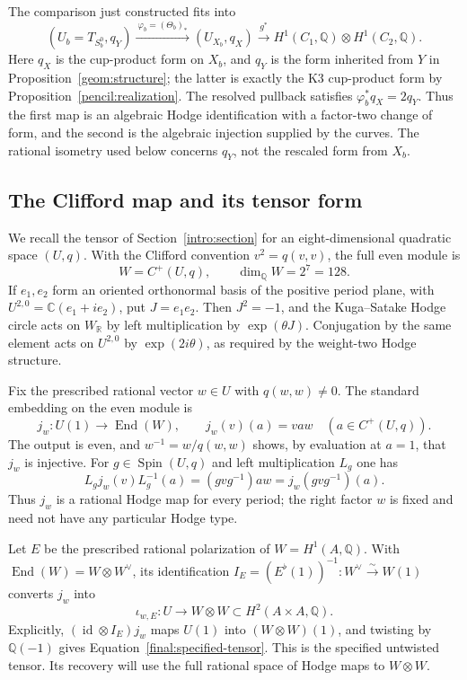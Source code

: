 \documentclass[11pt]{amsart}
\newcommand{\Q}{\mathbb Q}
\newcommand{\C}{\mathbb C}
\newcommand{\R}{\mathbb R}
\DeclareMathOperator{\End}{End}
\DeclareMathOperator{\Spin}{Spin}
\DeclareMathOperator{\id}{id}
\theoremstyle{definition}
\theoremstyle{remark}
\numberwithin{equation}{section}
\begin{document}
The comparison just constructed fits into
\[
 (U_b=T_{S_b^0},q_Y)
 \xrightarrow{\ \varphi_b=(\Theta_b)_*\ }
 (U_{X_b},q_X)
 \xrightarrow{\ g^*\ }
 H^1(C_1,\Q)\otimes H^1(C_2,\Q).
\]
Here $q_X$ is the cup-product form on $X_b$, and $q_Y$ is the form
inherited from $Y$ in Proposition~\ref{geom:structure}; the latter is
exactly the K3 cup-product form by Proposition~\ref{pencil:realization}.
The resolved pullback satisfies $\varphi_b^*q_X=2q_Y$.  Thus the first
map is an algebraic Hodge identification with a factor-two change of
form, and the second is the algebraic injection supplied by the curves.
The rational isometry used below concerns $q_Y$, not the rescaled
form from $X_b$.

\subsection{The Clifford map and its tensor form}

We recall the tensor of Section~\ref{intro:section} for an
eight-dimensional quadratic space $(U,q)$.  With the Clifford convention
$v^2=q(v,v)$, the full even module is
\[
 W=C^+(U,q),\qquad \dim_\Q W=2^7=128.
\]
If $e_1,e_2$ form an oriented orthonormal basis of the positive period
plane, with $U^{2,0}=\C(e_1+i e_2)$, put $J=e_1e_2$.  Then $J^2=-1$,
and the Kuga--Satake Hodge circle acts on $W_\R$ by left
multiplication by $\exp(\theta J)$.  Conjugation by the same element
acts on $U^{2,0}$ by $\exp(2i\theta)$, as required by the weight-two
Hodge structure.

Fix the prescribed rational vector $w\in U$ with $q(w,w)\ne0$.  The
standard embedding on the even module is
\begin{equation}\label{final:specified-clifford}
 j_w:U(1)\longrightarrow\End(W),\qquad
 j_w(v)(a)=vaw\quad(a\in C^+(U,q)).
\end{equation}
The output is even, and $w^{-1}=w/q(w,w)$ shows, by evaluation at
$a=1$, that $j_w$ is injective.  For $g\in\Spin(U,q)$ and left
multiplication $L_g$ one has
\[
 L_gj_w(v)L_g^{-1}(a)=(gvg^{-1})aw=j_w(gvg^{-1})(a).
\]
Thus $j_w$ is a rational Hodge map for every period; the right factor
$w$ is fixed and need not have any particular Hodge type.

Let $E$ be the prescribed rational polarization of $W=H^1(A,\Q)$.
With $\End(W)=W\otimes W^\vee$, its identification
$I_E=(E^\flat(1))^{-1}:W^\vee\xrightarrow{\sim}W(1)$ converts $j_w$ into
\begin{equation}\label{final:specified-tensor}
 \iota_{w,E}:U\longrightarrow W\otimes W
                  \subset H^2(A\times A,\Q).
\end{equation}
Explicitly, $(\id\otimes I_E)j_w$ maps $U(1)$ into
$(W\otimes W)(1)$, and twisting by $\Q(-1)$ gives
Equation~\eqref{final:specified-tensor}.  This is the specified untwisted
tensor.  Its recovery will use the full rational space of Hodge maps
to $W\otimes W$.
\end{document}
